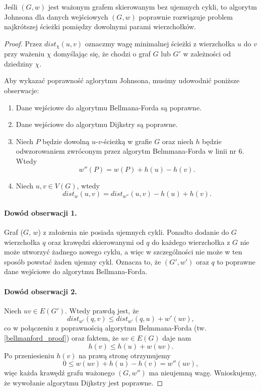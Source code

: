 \begin{theorem}
	Jeśli $(G, w)$ jest ważonym grafem skierowanym
	bez ujemnych cykli, to algorytm Johnsona dla 
	danych wejściowych $(G, w)$ poprawnie
	rozwiązuje problem najkrótszej ścieżki 
	pomiędzy dowolnymi parami wierzchołków.
	
	\begin{proof}
		Przez $dist_\chi(u, v)$ oznaczmy wagę minimalnej ścieżki
		z wierzchołka $u$ do $v$ przy ważeniu $\chi$ domyślając się, 
		że chodzi o graf $G$ lub $G'$ w zależności od dziedziny $\chi$.
		
		Aby wykazać poprawność aglorytmu Johnsona, 
		musimy udowodnić poniższe obserwacje:
		\begin{enumerate}
			\item Dane wejściowe do 
			algorytmu Bellmana-Forda są poprawne.
			\item Dane wejściowe do 
			algorytmu Dijkstry są poprawne.
			\item Niech $P$ będzie dowolną
			$u$-$v$-ścieżką w grafie $G$ oraz niech $h$
			będzie odwzorowaniem zwróconym przez algorytm
			Belmmana-Forda w linii nr 6. Wtedy
			\[w''(P) = w(P) +  h(u) - h(v).\]
			\item Niech $u, v \in V(G)$, wtedy
			\[dist_{w}(u, v) = dist_{w''}(u, v) - h(u) + h(v).\]
		\end{enumerate}
		
		\paragraph{Dowód obserwacji 1.} Graf ($G$, $w$)
		z założenia nie posiada ujemnych cykli. Ponadto
		dodanie do $G$ wierzchołka $q$ oraz krawędzi skierowanymi
		od $q$ do każdego wierzchołka z $G$ nie może utworzyć
		żadnego nowego cyklu, a więc w szczególności nie może
		w ten sposób powstać żaden ujemny cykl. Oznacza to, że
		$(G', w')$ oraz $q$ to poprawne dane wejściowe
		do algorytmu Bellmana-Forda.
		
		\paragraph{Dowód obserwacji 2.} Niech $uv \in E(G')$. Wtedy prawdą jest, że
		\[dist_{w'}(q, v) \leq dist_{w'}(q, u) + w'(uv),\]
		co w połączeniu z poprawnością algorytmu Belmmana-Forda (tw.
		\ref{bellmanford_proof}) oraz faktem, że 
		$uv \in E(G)$ daje nam
		\[h(v) \leq h(u) + w(uv).\]
		Po przeniesieniu $h(v)$ na prawą stronę otrzymujemy 
		\[0 \leq w(uv) + h(u) - h(v) = w''(uv),\]
		więc każda krawędź grafu ważonego $(G, w'')$ ma
		nieujemną wagę. Wnioskujemy, że wywołanie algorytmu 
		Dijkstry jest poprawne.  
		

\end{proof}
\end{theorem}
